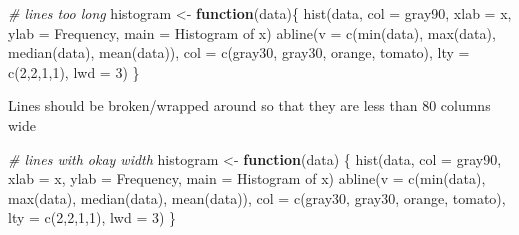 \documentclass[
]{book}
\newenvironment{Shaded}{\begin{snugshade}}{\end{snugshade}}
\newcommand{\AttributeTok}[1]{\textcolor[rgb]{0.77,0.63,0.00}{#1}}
\newcommand{\CommentTok}[1]{\textcolor[rgb]{0.56,0.35,0.01}{\textit{#1}}}
\newcommand{\ControlFlowTok}[1]{\textcolor[rgb]{0.13,0.29,0.53}{\textbf{#1}}}
\newcommand{\DecValTok}[1]{\textcolor[rgb]{0.00,0.00,0.81}{#1}}
\newcommand{\FunctionTok}[1]{\textcolor[rgb]{0.00,0.00,0.00}{#1}}
\newcommand{\NormalTok}[1]{#1}
\newcommand{\OtherTok}[1]{\textcolor[rgb]{0.56,0.35,0.01}{#1}}
\newcommand{\StringTok}[1]{\textcolor[rgb]{0.31,0.60,0.02}{#1}}
\begin{document}
\begin{Shaded}
\begin{Highlighting}[]
\CommentTok{\# lines too long}
\NormalTok{histogram }\OtherTok{\textless{}{-}} \ControlFlowTok{function}\NormalTok{(data)\{}
\FunctionTok{hist}\NormalTok{(data, }\AttributeTok{col =} \StringTok{\textquotesingle{}gray90\textquotesingle{}}\NormalTok{, }\AttributeTok{xlab =} \StringTok{\textquotesingle{}x\textquotesingle{}}\NormalTok{, }\AttributeTok{ylab =} \StringTok{\textquotesingle{}Frequency\textquotesingle{}}\NormalTok{, }\AttributeTok{main =} \StringTok{\textquotesingle{}Histogram of x\textquotesingle{}}\NormalTok{)}
\FunctionTok{abline}\NormalTok{(}\AttributeTok{v =} \FunctionTok{c}\NormalTok{(}\FunctionTok{min}\NormalTok{(data), }\FunctionTok{max}\NormalTok{(data), }\FunctionTok{median}\NormalTok{(data), }\FunctionTok{mean}\NormalTok{(data)),}
\AttributeTok{col =} \FunctionTok{c}\NormalTok{(}\StringTok{\textquotesingle{}gray30\textquotesingle{}}\NormalTok{, }\StringTok{\textquotesingle{}gray30\textquotesingle{}}\NormalTok{, }\StringTok{\textquotesingle{}orange\textquotesingle{}}\NormalTok{, }\StringTok{\textquotesingle{}tomato\textquotesingle{}}\NormalTok{), }\AttributeTok{lty =} \FunctionTok{c}\NormalTok{(}\DecValTok{2}\NormalTok{,}\DecValTok{2}\NormalTok{,}\DecValTok{1}\NormalTok{,}\DecValTok{1}\NormalTok{), }\AttributeTok{lwd =} \DecValTok{3}\NormalTok{)}
\NormalTok{\}}
\end{Highlighting}
\end{Shaded}

Lines should be broken/wrapped around so that they are less than 80 columns wide

\begin{Shaded}
\begin{Highlighting}[]
\CommentTok{\# lines with okay width}
\NormalTok{histogram }\OtherTok{\textless{}{-}} \ControlFlowTok{function}\NormalTok{(data) \{}
  \FunctionTok{hist}\NormalTok{(data, }\AttributeTok{col =} \StringTok{\textquotesingle{}gray90\textquotesingle{}}\NormalTok{, }\AttributeTok{xlab =} \StringTok{\textquotesingle{}x\textquotesingle{}}\NormalTok{, }\AttributeTok{ylab =} \StringTok{\textquotesingle{}Frequency\textquotesingle{}}\NormalTok{, }
       \AttributeTok{main =} \StringTok{\textquotesingle{}Histogram of x\textquotesingle{}}\NormalTok{)}
  \FunctionTok{abline}\NormalTok{(}\AttributeTok{v =} \FunctionTok{c}\NormalTok{(}\FunctionTok{min}\NormalTok{(data), }\FunctionTok{max}\NormalTok{(data), }\FunctionTok{median}\NormalTok{(data), }\FunctionTok{mean}\NormalTok{(data)),}
         \AttributeTok{col =} \FunctionTok{c}\NormalTok{(}\StringTok{\textquotesingle{}gray30\textquotesingle{}}\NormalTok{, }\StringTok{\textquotesingle{}gray30\textquotesingle{}}\NormalTok{, }\StringTok{\textquotesingle{}orange\textquotesingle{}}\NormalTok{, }\StringTok{\textquotesingle{}tomato\textquotesingle{}}\NormalTok{), }
         \AttributeTok{lty =} \FunctionTok{c}\NormalTok{(}\DecValTok{2}\NormalTok{,}\DecValTok{2}\NormalTok{,}\DecValTok{1}\NormalTok{,}\DecValTok{1}\NormalTok{), }\AttributeTok{lwd =} \DecValTok{3}\NormalTok{)}
\NormalTok{\}}
\end{Highlighting}
\end{Shaded}
\end{document}
